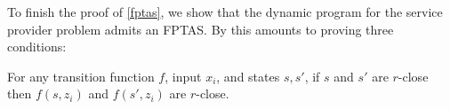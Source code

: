

    





To finish the proof of \cref{fptas}, we show that the dynamic program for the service provider problem admits an FPTAS. By \citet{woeginger2000} this amounts to proving three conditions: 

\begin{claim*}
     For any transition function $f$, input $x_i$, and states $s, s'$, if $s$ and $s'$ are $r$-close then $f(s, z_i)$ and $f(s', z_i)$ are $r$-close.
\end{claim*}

